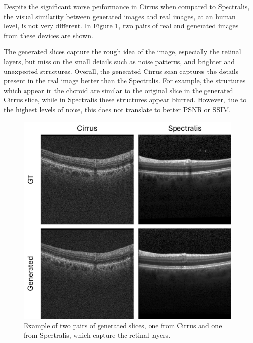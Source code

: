\par
Despite the significant worse performance in Cirrus when compared to Spectralis, the visual similarity between generated images and real images, at an human level, is not very different. In Figure \ref{fig:GeneratedSlicesCirrusVsSpectralis}, two pairs of real and generated images from these devices are shown.
\par
The generated slices capture the rough idea of the image, especially the retinal layers, but miss on the small details such as noise patterns, and brighter and unexpected structures. Overall, the generated Cirrus scan captures the details present in the real image better than the Spectralis. For example, the structures which appear in the choroid are similar to the original slice in the generated Cirrus slice, while in Spectralis these structures appear blurred. However, due to the highest levels of noise, this does not translate to better PSNR or SSIM.

\begin{figure}[!ht]
	\centering	\includegraphics[width=0.75\linewidth]{figures/GeneratedSlicesCirrusVsSpectralis.png}
	\caption{Example of two pairs of generated slices, one from Cirrus and one from Spectralis, which capture the retinal layers.}
	\label{fig:GeneratedSlicesCirrusVsSpectralis}
\end{figure}

